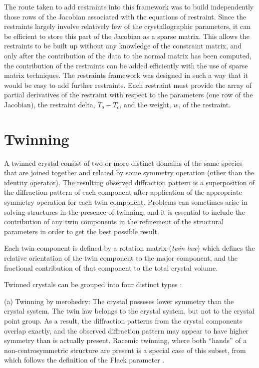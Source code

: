 \documentclass[pdf]{iucr}
\begin{document}
The route taken to add restraints into this framework was to build independently those rows of the Jacobian associated with the equations of restraint. Since the restraints largely involve relatively few of the crystallographic parameters, it can be efficient to store this part of the Jacobian as a sparse matrix. This allows the restraints to be built up without any knowledge of the constraint matrix, and only after the contribution of the data to the normal matrix has been computed, the contribution of the restraints can be added efficiently with the use of sparse matrix techniques. The restraints framework was designed in such a way that it would be easy to add further restraints. Each restraint must provide the array of partial derivatives of the restraint with respect to the parameters (one row of the Jacobian), the restraint delta, $T_o - T_c$, and the weight, $w$, of the restraint.


\section{Twinning}
\label{sec:ls_twinning}

A twinned crystal consist of two or more distinct domains of the same species that are joined together and related by some symmetry operation (other than the identity operator). The resulting observed diffraction pattern is a superposition of the diffraction pattern of each component after application of the appropriate symmetry operation for each twin component. Problems can sometimes arise in solving structures in the presence of twinning, and it is essential to include the contribution of any twin components in the refinement of the structural parameters in order to get the best possible result.

Each twin component is defined by a rotation matrix (\emph{twin law}) which defines the relative orientation of the twin component to the major component, and the fractional contribution of that component to the total crystal volume.

Twinned crystals can be grouped into four distinct types \cite{Herbst-Irmer:jz0004}:

(a) Twinning by merohedry: The crystal posseses lower symmetry than the crystal system. The twin law belongs to the crystal system, but not to the crystal point group. As a result, the diffraction patterns from the crystal components overlap exactly, and the observed diffraction pattern may appear to have higher symmetry than is actually present. Racemic twinning, where both ``hands'' of a non-centrosymmetric structure are present is a special case of this subset, from which follows the definition of the Flack parameter \cite{Flack:a22047}.
\end{document}
